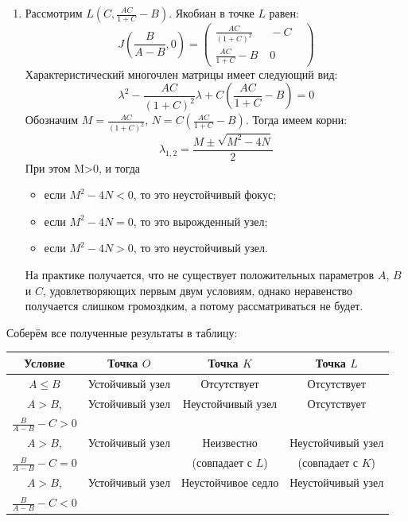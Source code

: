 \documentclass{article}
\begin{document}
\begin{enumerate}
\item Рассмотрим $L \left(C, \frac{AC}{1 + C} - B\right)$.  Якобиан в точке $L$ равен:
\begin{equation*}
J\left(\frac{B}{A-B}, 0\right) = \begin{pmatrix}  \frac{AC}{(1 + C)^2} &\;  -C &\\ \frac{AC}{1 + C} - B &\; 0 &\end{pmatrix}
\end{equation*}
Характеристический многочлен матрицы имеет следующий вид:
\begin{equation*}
\lambda^2 - \frac{AC}{(1 + C)^2} \lambda + C \left(\frac{AC}{1 + C} - B \right) = 0
\end{equation*}
Обозначим $M = \frac{AC}{(1 + C)^2}$, $N = C \left(\frac{AC}{1 + C} - B \right)$. Тогда имеем корни:
\begin{equation*}
\lambda_{1,2} = \frac{M \pm \sqrt{M^2 - 4 N}}{2}
\end{equation*}
При этом M>0, и тогда
\begin{itemize}
\item если $M^2 - 4 N < 0$, то это неустойчивый фокус;
\item если $M^2 - 4 N = 0$, то это вырожденный узел;
\item если $M^2 - 4 N > 0$, то это неустойчивый узел.
\end{itemize}
На практике получается, что не существует положительных параметров $A$, $B$ и $C$, удовлетворяющих первым двум условиям, однако неравенство получается слишком громоздким, а потому рассматриваться не будет.
\end{enumerate}

Соберём все полученные результаты в таблицу:

\begin{tabular}{|c|c|c|c| }
\hline
\textbf{Условие} & \textbf{Точка $O$} & \textbf{Точка $K$} & \textbf{Точка $L$}  \\ \hline
$A \leq B$ & Устойчивый узел & Отсутствует & Отсутствует\\ \hline
$A > B$,  & Устойчивый узел & Неустойчивый узел & Отсутствует\\ 
$\frac{B}{A - B} - C > 0$ & & & \\ \hline
$A > B$,  & Устойчивый узел & Неизвестно & Неустойчивый узел\\ 
$\frac{B}{A - B} - C = 0$ & &  (совпадает с $L$) &  (совпадает с $K$) \\ \hline
$A > B$,  & Устойчивый узел & Неустойчивое седло & Неустойчивый узел\\ 
$\frac{B}{A - B} - C < 0$ & & & \\ \hline
\end{tabular}
\end{document}
